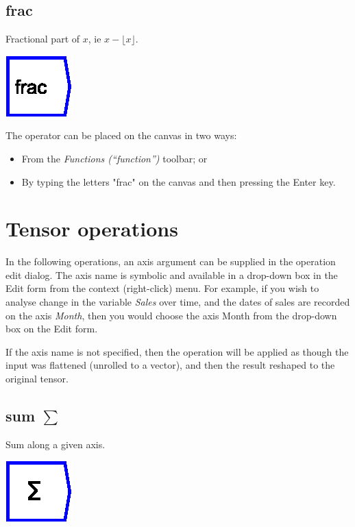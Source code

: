 \subsection{frac}

\label{Operation:frac} Fractional part of $x$, ie $x-\lfloor x\rfloor$.

\includegraphics{images/frac}

The operator can be placed on the canvas in two ways:
\begin{itemize}
\item From the \emph{Functions (``function'')} toolbar; or 
\item By typing the letters "frac" on the canvas and then pressing the
Enter key.
\end{itemize}

\section{Tensor operations}

\label{tensor   operations}

In the following operations, an axis argument can be supplied in the
operation edit dialog. The axis name is symbolic and available in
a drop-down box in the Edit form from the context (right-click) menu.
For example, if you wish to analyse change in the variable \emph{Sales}
over time, and the dates of sales are recorded on the axis \emph{Month},
then you would choose the axis Month from the drop-down box on the
Edit form.

If the axis name is not specified, then the operation will be applied
as though the input was flattened (unrolled to a vector), and then
the result reshaped to the original tensor.

\subsection{sum $\sum$}

\label{Operation:sum} Sum along a given axis.

\includegraphics{images/sum}

